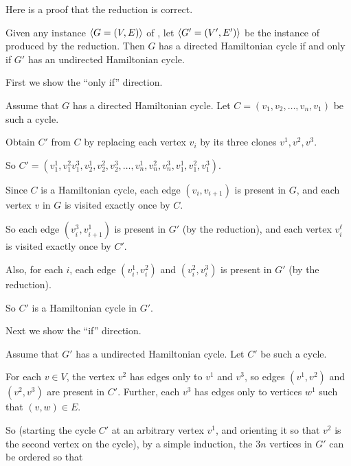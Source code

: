 \documentclass[11pt]{article}
\begin{document}
\begin{problems}
  \medskip 
  Here is a proof that the reduction is correct.
  \begin{lemma}
    Given any instance $\langle G=(V,E) \rangle$ of ,
    let $\langle G'=(V',E') \rangle$ be the instance of  produced by the reduction.
    Then $G$ has a directed Hamiltonian cycle 
    if and only if $G'$ has an undirected Hamiltonian cycle.
  \end{lemma}
  \begin{longFormProof}
    \step First we show the ``only if'' direction.
    \begin{block}[2oi]
      {Assume that $G$ has a directed Hamiltonian cycle.}
      \step Let $C=(v_1, v_2, \ldots, v_n, v_1)$ be such a cycle.
      \smallskip 
      
      \step Obtain $C'$ from $C$ by replacing each vertex $v_i$ by its three clones $v^1, v^2, v^3$.

      \step So $C'=(v^1_1, v^2_1 v^3_1, v^1_2, v^2_2, v^3_2, \ldots, v^1_n,  v^2_n,  v^3_n,  v^1_1,  v^2_1,  v^3_1)$.

      \step Since $C$ is a Hamiltonian cycle, each edge $(v_i, v_{i+1})$ is present in $G$,
      and each vertex $v$ in $G$ is visited exactly once by $C$.

      \step So each edge $(v^3_i, v^1_{i+1})$ is present in $G'$ (by the reduction),
      and each vertex $v_i^\ell$ is visited exactly once by $C'$.

      \step Also, for each $i$, each edge $(v^1_i, v^2_i)$ and $(v^2_i, v^3_i)$ is present in $G'$ (by the reduction). 

      \step So $C'$ is a Hamiltonian cycle in $G'$.

      \smallskip 
    \end{block} 
    \step Next we show the ``if'' direction.
    \begin{block}[2i]
      {Assume that $G'$ has a undirected Hamiltonian cycle.}
      \step Let $C'$ be such a cycle.
      \smallskip 

      \step For each $v\in V$, the vertex $v^2$ has edges only to $v^1$ and $v^3$,
      so edges $(v^1, v^2)$ and $(v^2, v^3)$ are present in $C'$.
      Further, each $v^3$ has edges only to vertices $w^1$ such that $(v,w)\in E$.

      \step So (starting the cycle $C'$ at an arbitrary vertex $v^1$, and orienting it so that
      $v^2$ is the second vertex on the cycle), by a simple induction, the $3n$ vertices in $G'$ can be ordered so that


\end{block}
\end{longFormProof}
\end{problems}
\end{document}
